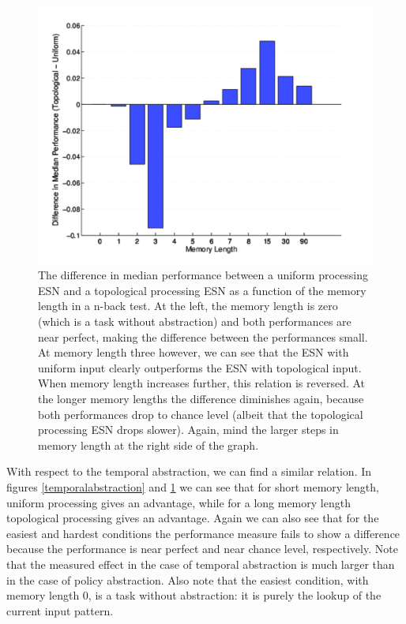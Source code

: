\documentclass[10pt,a4paper]{report}
\begin{document}
\begin{figure}[bthp]
\includegraphics[width=\textwidth]{figures/membar.png}
\caption{ The difference in median performance between a uniform processing ESN and a topological processing ESN as a function of the memory length in a n-back test. At the left, the memory length is zero (which is a task without abstraction) and both performances are near perfect, making the difference between the performances small. At memory length three however, we can see that the ESN with uniform input clearly outperforms the ESN with topological input. When memory length increases further, this relation is reversed. At the longer memory lengths the difference diminishes again, because both performances drop to chance level (albeit that the topological processing ESN drops slower). Again, mind the larger steps in memory length at the right side of the graph. }
\label{temporalabstractionbar}
\end{figure}

With respect to the temporal abstraction, we can find a similar relation. In figures \ref{temporalabstraction} and \ref{temporalabstractionbar} we can see that for short memory length, uniform processing gives an advantage, while for a long memory length topological processing gives an advantage. Again we can also see that for the easiest and hardest conditions the performance measure fails to show a difference because the performance is near perfect and near chance level, respectively. Note that the measured effect in the case of temporal abstraction is much larger than in the case of policy abstraction. Also note that the easiest condition, with memory length 0, is a task without abstraction: it is purely the lookup of the current input pattern.
\end{document}
